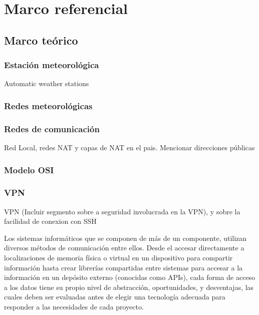 \section{Marco referencial}

\subsection{Marco teórico}

\subsubsection{Estación meteorológica}

Automatic weather stations


\subsubsection{Redes meteorológicas}

\subsubsection{Redes de comunicación}

Red Local, redes NAT y capas de NAT en el pais. Mencionar direcciones públicas

\subsubsection{Modelo OSI}

\subsubsection{VPN}

VPN (Incluir segmento sobre a seguridad involucrada en la VPN), y sobre la facilidad de conexion con SSH



Los sistemas informáticos que se componen de más de un componente, utilizan diversos métodos de comunicación entre ellos. Desde el accesar directamente a localizaciones de memoria física o virtual en un dispositivo para compartir información hasta crear librerías compartidas entre sistemas para accesar a la información en un depósito externo (conocidas como APIs), cada forma de acceso a los datos tiene su propio nivel de abstracción, oportunidades, y desventajas, las cuales deben ser evaluadas antes de elegir una tecnología adecuada para responder a las necesidades de cada proyecto.

